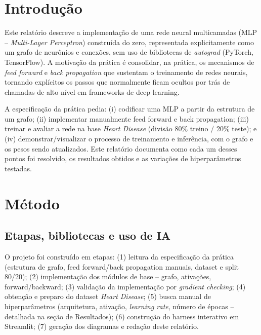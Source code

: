 
\section{Introdução}

Este relatório descreve a implementação de uma rede neural multicamadas
(MLP -- \textit{Multi-Layer Perceptron}) construída do zero, representada
explicitamente como um grafo de neurônios e conexões, sem uso de bibliotecas
de \textit{autograd} (PyTorch, TensorFlow). A motivação da prática é
consolidar, na prática, os mecanismos de \textit{feed forward} e
\textit{back propagation} que sustentam o treinamento de redes neurais,
tornando explícitos os passos que normalmente ficam ocultos por trás de
chamadas de alto nível em frameworks de deep learning.

A especificação da prática pedia: (i) codificar uma MLP a partir da
estrutura de um grafo; (ii) implementar manualmente feed forward e back
propagation; (iii) treinar e avaliar a rede na base \textit{Heart Disease}
(divisão 80\% treino / 20\% teste); e (iv) demonstrar/visualizar o processo
de treinamento e inferência, com o grafo e os pesos sendo atualizados.
Este relatório documenta como cada um desses pontos foi resolvido, os
resultados obtidos e as variações de hiperparâmetros testadas.

\section{Método}

\subsection{Etapas, bibliotecas e uso de IA}

O projeto foi construído em etapas: (1) leitura da especificação da
prática (estrutura de grafo, feed forward/back propagation manuais,
dataset e split 80/20); (2) implementação dos módulos de base -- grafo,
ativações, forward/backward; (3) validação da implementação por
\textit{gradient checking}; (4) obtenção e preparo do dataset
\textit{Heart Disease}; (5) busca manual de hiperparâmetros (arquitetura,
ativação, \textit{learning rate}, número de épocas -- detalhada na seção
de Resultados); (6) construção do harness interativo em Streamlit;
(7) geração dos diagramas e redação deste relatório.

